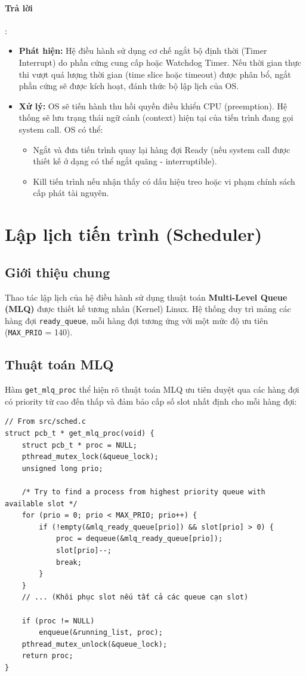 \documentclass[a4paper]{article}
\begin{document}
\paragraph{Trả lời}:
\begin{itemize}
    \item \textbf{Phát hiện:} Hệ điều hành sử dụng cơ chế ngắt bộ định thời (Timer Interrupt) do phần cứng cung cấp hoặc Watchdog Timer. Nếu thời gian thực thi vượt quá lượng thời gian (time slice hoặc timeout) được phân bổ, ngắt phần cứng sẽ được kích hoạt, đánh thức bộ lập lịch của OS.
    \item \textbf{Xử lý:} OS sẽ tiến hành thu hồi quyền điều khiển CPU (preemption). Hệ thống sẽ lưu trạng thái ngữ cảnh (context) hiện tại của tiến trình đang gọi system call. OS có thể:
          \begin{itemize}
              \item Ngắt và đưa tiến trình quay lại hàng đợi Ready (nếu system call được thiết kế ở dạng có thể ngắt quãng - interruptible).
              \item Kill tiến trình nếu nhận thấy có dấu hiệu treo hoặc vi phạm chính sách cấp phát tài nguyên.
          \end{itemize}
\end{itemize}
\pagebreak

\section{Lập lịch tiến trình (Scheduler)}

\subsection{Giới thiệu chung}
Thao tác lập lịch của hệ điều hành sử dụng thuật toán \textbf{Multi-Level Queue (MLQ)} được thiết kế tương nhân (Kernel) Linux. Hệ thống duy trì mảng các hàng đợi \texttt{ready\_queue}, mỗi hàng đợi tương ứng với một mức độ ưu tiên (\texttt{MAX\_PRIO} = 140).

\subsection{Thuật toán MLQ}
Hàm \texttt{get\_mlq\_proc} thể hiện rõ thuật toán MLQ ưu tiên duyệt qua các hàng đợi có priority từ cao đến thấp và đảm bảo cấp số slot nhất định cho mỗi hàng đợi:
\begin{verbatim}
// From src/sched.c
struct pcb_t * get_mlq_proc(void) {
    struct pcb_t * proc = NULL;
    pthread_mutex_lock(&queue_lock);
    unsigned long prio;

    /* Try to find a process from highest priority queue with available slot */
    for (prio = 0; prio < MAX_PRIO; prio++) {
        if (!empty(&mlq_ready_queue[prio]) && slot[prio] > 0) {
            proc = dequeue(&mlq_ready_queue[prio]);
            slot[prio]--;
            break;
        }
    }
    // ... (Khôi phục slot nếu tất cả các queue cạn slot)
    
    if (proc != NULL)
        enqueue(&running_list, proc);
    pthread_mutex_unlock(&queue_lock);
    return proc;	
}
\end{verbatim}
\end{document}
